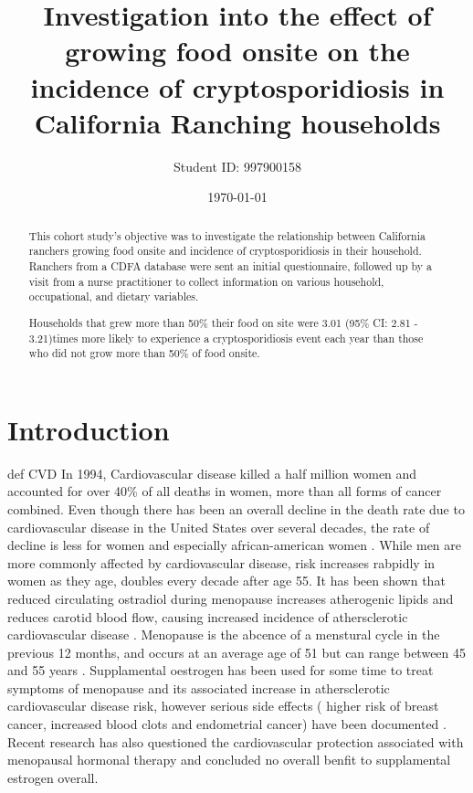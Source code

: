 \documentclass[12pt]{article}
\title{Investigation into the effect of growing food onsite on the incidence of cryptosporidiosis in California Ranching households}
\author{Student ID: 997900158}
\date{\today}
\begin{document}
	\maketitle
	\begin{abstract}
		This cohort study's objective was to investigate the relationship between California ranchers growing food onsite and incidence of cryptosporidiosis in their household.
		Ranchers from a CDFA database were sent an initial questionnaire, followed up by a visit from a nurse practitioner to collect information on various household, occupational, and dietary variables.


		Households that grew more than 50\% their food  on site were 3.01 (95\% CI: 2.81 - 3.21)times more likely to experience a cryptosporidiosis event each year than those who did not grow more than 50\% of food onsite.

	\end{abstract}

\onehalfspace
	\section{Introduction} 
		def CVD 
		In 1994, Cardiovascular disease killed a half million women and accounted for over 40\% of all deaths in women, more than all forms of cancer combined\cite{AHA1997}.
		Even though there has been an overall decline in the death rate due to cardiovascular disease in the United States over several decades, the rate of decline is less for women and especially african-american women \cite{Mosca1997}.
		While men are more commonly affected by cardiovascular disease, risk increases rabpidly in women as they age, doubles every decade after age 55\cite{Gordon1978}. 
		It has been shown that reduced circulating ostradiol during menopause increases atherogenic lipids and reduces carotid blood flow, causing increased incidence of athersclerotic cardiovascular disease \cite{Hodis}.
		Menopause is the abcence of a menstural cycle in the previous 12 months, and occurs at an average age of 51 but can range between 45 and 55 years \cite{Gold2012}. 
		Supplamental oestrogen has been used for some time to treat symptoms of menopause and its associated increase in athersclerotic cardiovascular disease risk, however serious side effects ( higher risk of breast cancer, increased blood clots and endometrial cancer) have been documented \cite{Gold2012}.
		Recent research has also questioned the cardiovascular protection associated with menopausal hormonal therapy and concluded no overall benfit to supplamental estrogen overall\cite{Anderson2004}.
\end{document}
